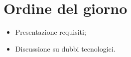 \section{Ordine del giorno}

\begin{itemize}
\item Presentazione requisiti;
\item Discussione su dubbi tecnologici.
\end{itemize}